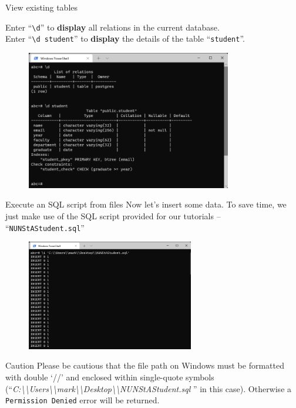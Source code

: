 \begin{frame}[fragile]{View existing tables}
	
	Enter ``\texttt{\textbackslash d}'' to \textbf{display} all relations in the current database.\\
	Enter ``\texttt{\textbackslash d student}'' to \textbf{display} the details of the table ``\texttt{student}''.
	\begin{figure}
		\includegraphics[width=0.8\textwidth]{t0-psql/images/6.png}
	\end{figure}
		
\end{frame}

\begin{frame}[fragile]{Execute an SQL script from files}
	Now let's insert some data. To save time, we just make use of the SQL script provided for our tutorials -- ``\texttt{NUNStAStudent.sql}''
	
	\begin{figure}
		\includegraphics[trim=0 5cm 0 0, clip, width=0.65\textwidth]{t0-psql/images/7.png}
	\end{figure}
	
	\begin{alertblock}{Caution}
		Please be cautious that the file path on Windows must be formatted with double `//' and enclosed within single-quote symbols (``\textit{C:\textbackslash\textbackslash Users\textbackslash\textbackslash mark\textbackslash\textbackslash Desktop\textbackslash\textbackslash NUNStAStudent.sql }'' in this case). Otherwise a \texttt{Permission Denied} error will be returned.
	\end{alertblock}
	
\end{frame}


